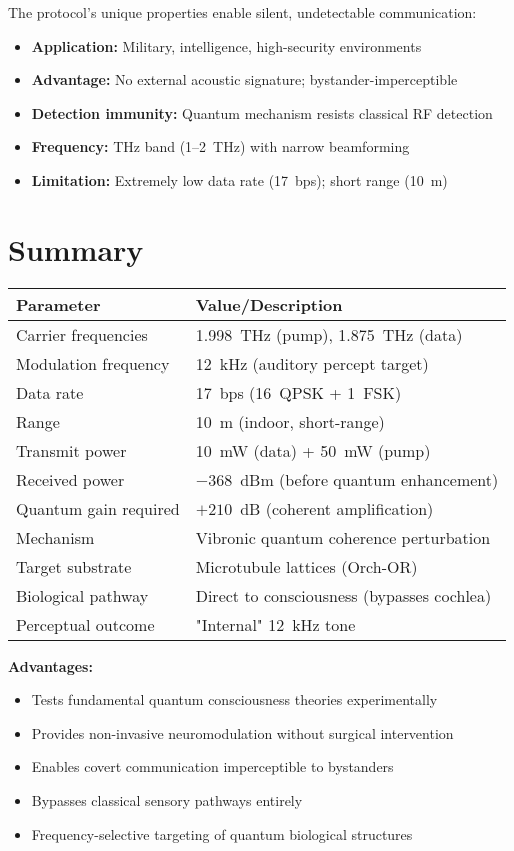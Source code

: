 The protocol's unique properties enable silent, undetectable communication:

\begin{itemize}
\item \textbf{Application:} Military, intelligence, high-security environments
\item \textbf{Advantage:} No external acoustic signature; bystander-imperceptible
\item \textbf{Detection immunity:} Quantum mechanism resists classical RF detection
\item \textbf{Frequency:} THz band (1--2~THz) with narrow beamforming
\item \textbf{Limitation:} Extremely low data rate (17~bps); short range (10~m)
\end{itemize}

\section{Summary}

\begin{center}
\begin{tabular}{@{}ll@{}}
\toprule
\textbf{Parameter} & \textbf{Value/Description} \\
\midrule
Carrier frequencies & 1.998~THz (pump), 1.875~THz (data) \\
Modulation frequency & 12~kHz (auditory percept target) \\
Data rate & 17~bps (16~QPSK + 1~FSK) \\
Range & 10~m (indoor, short-range) \\
Transmit power & 10~mW (data) + 50~mW (pump) \\
Received power & $-368$~dBm (before quantum enhancement) \\
Quantum gain required & $+210$~dB (coherent amplification) \\
Mechanism & Vibronic quantum coherence perturbation \\
Target substrate & Microtubule lattices (Orch-OR) \\
Biological pathway & Direct to consciousness (bypasses cochlea) \\
Perceptual outcome & "Internal" 12~kHz tone \\
\bottomrule
\end{tabular}
\end{center}

\textbf{Advantages:}
\begin{itemize}
\item Tests fundamental quantum consciousness theories experimentally
\item Provides non-invasive neuromodulation without surgical intervention
\item Enables covert communication imperceptible to bystanders
\item Bypasses classical sensory pathways entirely
\item Frequency-selective targeting of quantum biological structures
\end{itemize}

